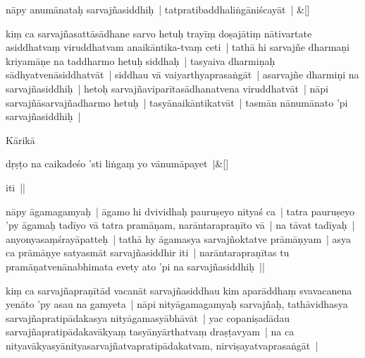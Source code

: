 \documentclass[article,12pt,a4paper]{memoir}%
\newcounter{parCount}
\begin{document}
	    
	    \stanza[\smallbreak]
	  nāpy anumānataḥ sarvajñasiddhiḥ | tatpratibaddhaliṅgāniścayāt | \&[\smallbreak]
	  
	  
	  

	  
	  \pstart \leavevmode%
	\label{thakur75-29.19}kiṃ ca sarvajñasattāsādhane sarvo hetuḥ trayīṃ doṣajātiṃ nātivartate asiddhatvaṃ viruddhatvam anaikāntika-tvaṃ ceti | tathā hi sarvajñe dharmaṇi kriyamāṇe na taddharmo hetuḥ siddhaḥ | tasyaiva dharmiṇaḥ sādhyatvenāsiddhatvāt | siddhau vā vaiyarthyaprasaṅgāt | asarvajñe dharmiṇi na sarvajñasiddhiḥ | hetoḥ sarvajñaviparītasādhanatvena viruddhatvāt | nāpi sarvajñāsarvajñadharmo hetuḥ | tasyānaikāntikatvāt | tasmān nānumānato 'pi sarvajñasiddhiḥ | 
	{}
	\pend%
      

	  
	  \pstart \leavevmode%
	Kārikā
	{}
	\pend%
      
	    
	    \stanza[\smallbreak]
	  dṛṣṭo na caikadeśo 'sti liṅgaṃ yo vānumāpayet |\&[\smallbreak]
	  
	  
	  

	  
	  \pstart \leavevmode%
	iti ||
	{}
	\pend%
      

	  
	  \pstart \leavevmode%
	\label{thakur75-29.27}nāpy āgamagamyaḥ | āgamo hi dvividhaḥ pauruṣeyo nityaś ca | tatra pauruṣeyo 'py āgamaḥ tadīyo vā tatra pramāṇam, narāntarapraṇīto vā | na tāvat tadīyaḥ | anyonyasaṃśrayāpatteḥ | tathā hy āgamasya sarvajñoktatve prāmāṇyam | asya ca prāmāṇye satyasmāt sarvajñasiddhir iti | narāntarapraṇītas tu pramāṇatvenānabhimata evety ato 'pi na sarvajñasiddhiḥ || 
	{}
	\pend%
      

	  
	  \pstart \leavevmode%
	\label{thakur75-30.1}kiṃ ca sarvajñapraṇītād vacanāt sarvajñasiddhau kim aparāddhaṃ svavacanena yenāto 'py asau na gamyeta | nāpi nityāgamagamyaḥ sarvajñaḥ, tathāvidhasya sarvajñapratipādakasya nityāgamasyābhāvāt | yac copaniṣadādau sarvajñapratipādakavākyaṃ tasyānyārthatvaṃ draṣṭavyam | na ca nityavākyasyānityasarvajñatvapratipādakatvam, nirviṣayatvaprasaṅgāt | 
	{}
	\pend%
      
\end{document}
